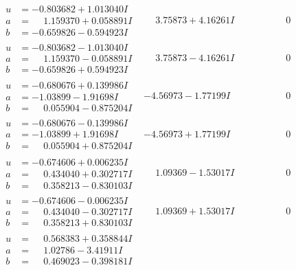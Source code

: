 \documentclass[1p]{elsarticle_modified}
\theoremstyle{definition}
\begin{document}
$$\begin{array}{c|c|c}
\begin{aligned}
u &= -0.803682 + 1.013040 I \\
a &= \phantom{-}1.159370 + 0.058891 I \\
b &= -0.659826 - 0.594923 I\end{aligned}
 & \phantom{-}3.75873 + 4.16261 I & \phantom{-0.000000 } 0 \\ \hline\begin{aligned}
u &= -0.803682 - 1.013040 I \\
a &= \phantom{-}1.159370 - 0.058891 I \\
b &= -0.659826 + 0.594923 I\end{aligned}
 & \phantom{-}3.75873 - 4.16261 I & \phantom{-0.000000 } 0 \\ \hline\begin{aligned}
u &= -0.680676 + 0.139986 I \\
a &= -1.03899 - 1.91698 I \\
b &= \phantom{-}0.055904 - 0.875204 I\end{aligned}
 & -4.56973 - 1.77199 I & \phantom{-0.000000 } 0 \\ \hline\begin{aligned}
u &= -0.680676 - 0.139986 I \\
a &= -1.03899 + 1.91698 I \\
b &= \phantom{-}0.055904 + 0.875204 I\end{aligned}
 & -4.56973 + 1.77199 I & \phantom{-0.000000 } 0 \\ \hline\begin{aligned}
u &= -0.674606 + 0.006235 I \\
a &= \phantom{-}0.434040 + 0.302717 I \\
b &= \phantom{-}0.358213 - 0.830103 I\end{aligned}
 & \phantom{-}1.09369 - 1.53017 I & \phantom{-0.000000 } 0 \\ \hline\begin{aligned}
u &= -0.674606 - 0.006235 I \\
a &= \phantom{-}0.434040 - 0.302717 I \\
b &= \phantom{-}0.358213 + 0.830103 I\end{aligned}
 & \phantom{-}1.09369 + 1.53017 I & \phantom{-0.000000 } 0 \\ \hline\begin{aligned}
u &= \phantom{-}0.568383 + 0.358844 I \\
a &= \phantom{-}1.02786 - 3.41911 I \\
b &= \phantom{-}0.469023 - 0.398181 I\end{aligned}

\end{array}$$
\end{document}
